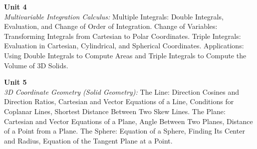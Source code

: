 \noindent\textbf{Unit 4} \\
\textit{Multivariable Integration Calculus:} Multiple Integrals: Double Integrals, Evaluation, and Change of Order of Integration. Change of Variables: Transforming Integrals from Cartesian to Polar Coordinates. Triple Integrals: Evaluation in Cartesian, Cylindrical, and Spherical Coordinates. Applications: Using Double Integrals to Compute Areas and Triple Integrals to Compute the Volume of 3D Solids.

\vspace{0.3cm}

\noindent\textbf{Unit 5} \\
\textit{3D Coordinate Geometry (Solid Geometry):} The Line: Direction Cosines and Direction Ratios, Cartesian and Vector Equations of a Line, Conditions for Coplanar Lines, Shortest Distance Between Two Skew Lines. The Plane: Cartesian and Vector Equations of a Plane, Angle Between Two Planes, Distance of a Point from a Plane. The Sphere: Equation of a Sphere, Finding Its Center and Radius, Equation of the Tangent Plane at a Point.

\newpage
{}